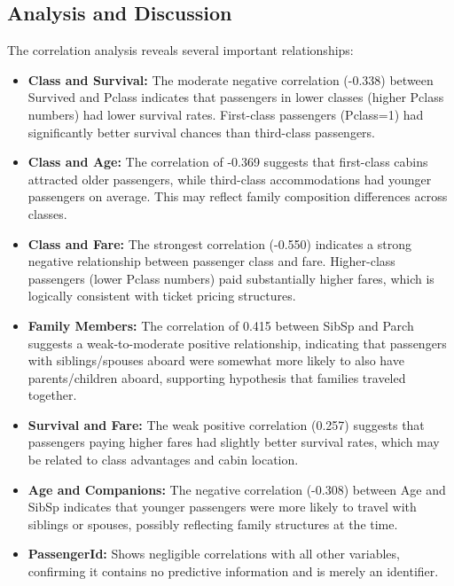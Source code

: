 \documentclass[12pt,a4paper]{article}
\begin{document}
\subsection{Analysis and Discussion}

The correlation analysis reveals several important relationships:

\begin{itemize}
    \item \textbf{Class and Survival:} The moderate negative correlation (-0.338) between Survived and Pclass indicates that passengers in lower classes (higher Pclass numbers) had lower survival rates. First-class passengers (Pclass=1) had significantly better survival chances than third-class passengers.

    \item \textbf{Class and Age:} The correlation of -0.369 suggests that first-class cabins attracted older passengers, while third-class accommodations had younger passengers on average. This may reflect family composition differences across classes.

    \item \textbf{Class and Fare:} The strongest correlation (-0.550) indicates a strong negative relationship between passenger class and fare. Higher-class passengers (lower Pclass numbers) paid substantially higher fares, which is logically consistent with ticket pricing structures.

    \item \textbf{Family Members:} The correlation of 0.415 between SibSp and Parch suggests a weak-to-moderate positive relationship, indicating that passengers with siblings/spouses aboard were somewhat more likely to also have parents/children aboard, supporting hypothesis that families traveled together.

    \item \textbf{Survival and Fare:} The weak positive correlation (0.257) suggests that passengers paying higher fares had slightly better survival rates, which may be related to class advantages and cabin location.

    \item \textbf{Age and Companions:} The negative correlation (-0.308) between Age and SibSp indicates that younger passengers were more likely to travel with siblings or spouses, possibly reflecting family structures at the time.

    \item \textbf{PassengerId:} Shows negligible correlations with all other variables, confirming it contains no predictive information and is merely an identifier.
\end{itemize}
\end{document}
